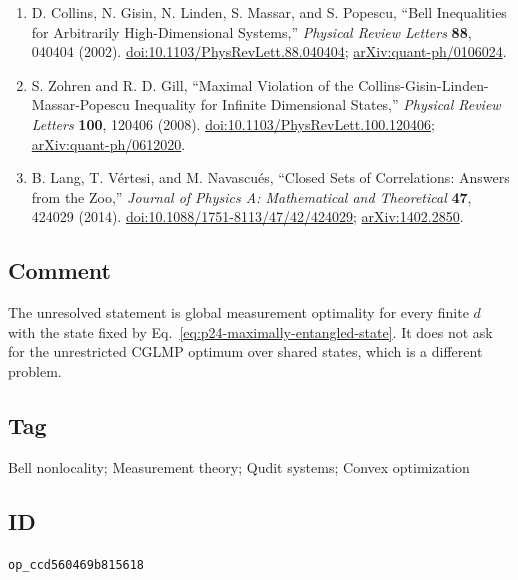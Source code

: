 \begin{enumerate}[label={},leftmargin=4.8em,labelsep=0.5em]
  \footnotesize
  \item[\textup{[CGLMP02]}]\label{ref:p24-cglmp}
  D. Collins, N. Gisin, N. Linden, S. Massar, and S. Popescu,
  ``Bell Inequalities for Arbitrarily High-Dimensional Systems,''
  \emph{Physical Review Letters} \textbf{88}, 040404 (2002).
  \href{https://doi.org/10.1103/PhysRevLett.88.040404}{doi:10.1103/PhysRevLett.88.040404};
  \href{https://arxiv.org/abs/quant-ph/0106024}{arXiv:quant-ph/0106024}.

  \item[\textup{[ZG08]}]\label{ref:p24-zohren-gill}
  S. Zohren and R. D. Gill,
  ``Maximal Violation of the Collins-Gisin-Linden-Massar-Popescu Inequality
  for Infinite Dimensional States,''
  \emph{Physical Review Letters} \textbf{100}, 120406 (2008).
  \href{https://doi.org/10.1103/PhysRevLett.100.120406}{doi:10.1103/PhysRevLett.100.120406};
  \href{https://arxiv.org/abs/quant-ph/0612020}{arXiv:quant-ph/0612020}.

  \item[\textup{[LVN14]}]\label{ref:p24-lang}
  B. Lang, T. Vértesi, and M. Navascués,
  ``Closed Sets of Correlations: Answers from the Zoo,''
  \emph{Journal of Physics A: Mathematical and Theoretical} \textbf{47},
  424029 (2014).
  \href{https://doi.org/10.1088/1751-8113/47/42/424029}{doi:10.1088/1751-8113/47/42/424029};
  \href{https://arxiv.org/abs/1402.2850}{arXiv:1402.2850}.
\end{enumerate}

\subsection*{Comment}

The unresolved statement is global measurement optimality for every finite
$d$ with the state fixed by Eq.~\eqref{eq:p24-maximally-entangled-state}.  It
does not ask for the unrestricted CGLMP optimum over shared states, which is a
different problem.

\subsection*{Tag}

Bell nonlocality; Measurement theory; Qudit systems; Convex optimization

\subsection*{ID}

\texttt{op\_ccd560469b815618}
